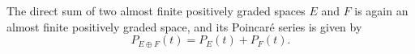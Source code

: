 The direct sum of two almost finite positively graded spaces $E$ and $F$ is again an almost finite positively graded space, and its Poincaré series is given by
$$P_{E \oplus F}(t) = P_E(t) + P_F(t).$$
